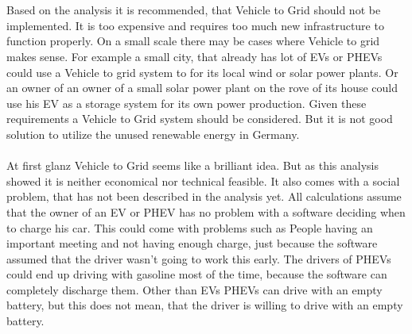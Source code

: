 \begin{parcolumns}[colwidths={1=2.5 cm, 2=10 cm, 3=2.5cm}]{3}
{\\ \\
\noindent
Based on the analysis it is recommended, that Vehicle to Grid should not be implemented. It is too expensive and requires too much new infrastructure to function properly. On a small scale there may be cases where Vehicle to grid makes sense. For example a small city, that already has lot of EVs or PHEVs could use a Vehicle to grid system to for its local wind or solar power plants. Or an owner of an owner of a small solar power plant on the rove of its house could use his EV as a storage system for its own power production. Given these requirements a Vehicle to Grid system should be considered. But it is not good solution to utilize the unused renewable energy in Germany.
\\ \\
\noindent
At first glanz Vehicle to Grid seems like a brilliant idea. But as this analysis showed it is neither economical nor technical feasible. It also comes with a social problem, that has not been described in the analysis yet. All calculations assume that the owner of an EV or PHEV has no problem with a software deciding when to charge his car. This could come with problems such as People having an important meeting and not having enough charge, just because the software assumed that the driver wasn't going to work this early. The drivers of PHEVs could end up driving with gasoline most of the time, because the software can completely discharge them. Other than EVs PHEVs can drive with an empty battery, but this does not mean, that the driver is willing to drive with an empty battery.
}


\end{parcolumns}
